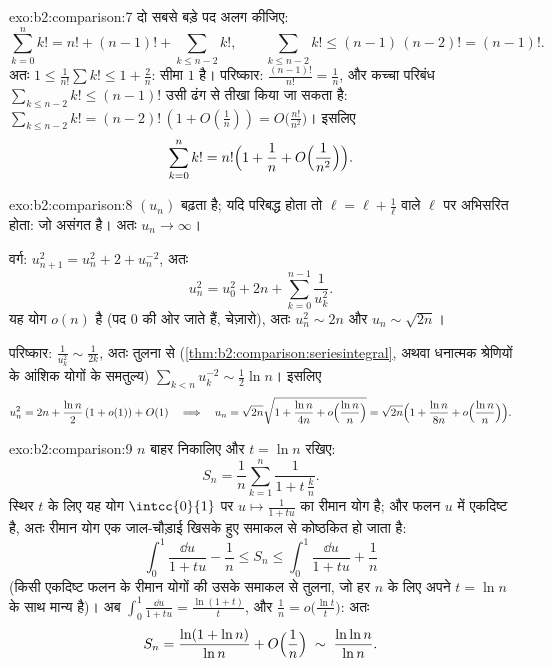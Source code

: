 \begin{solution}{exo:b2:comparison:7}
दो सबसे बड़े पद अलग कीजिए:
\[
\sum_{k=0}^{n} k! = n! + (n-1)! + \sum_{k \leq n-2} k! ,
\qquad
\sum_{k\leq n-2} k! \leq (n-1)\,(n-2)! = (n-1)! .
\]
अतः $1 \leq \frac{1}{n!}\sum k! \leq 1 + \frac{2}{n}$: सीमा $1$ है। परिष्कार: $\frac{(n-1)!}{n!} = \frac1n$, और कच्चा परिबंध $\sum_{k \leq n-2}k! \leq (n-1)!$ उसी ढंग से
तीखा किया जा सकता है: $\sum_{k\leq n-2} k! = (n-2)!\,(1 + O(\frac1n)) = O\bigl(\frac{n!}{n^2}\bigr)$। इसलिए
\[
\sum_{k=0}^{n} k! = n!\Bigl(1 + \frac1n + O\Bigl(\frac{1}{n^2}\Bigr)\Bigr).
\]
\end{solution}

\begin{solution}{exo:b2:comparison:8}
$(u_n)$ बढ़ता है; यदि परिबद्ध होता तो $\ell = \ell + \frac1\ell$ वाले $\ell$ पर अभिसरित होता: जो असंगत
है। अतः $u_n \to \infty$।

वर्ग: $u_{n+1}^2 = u_n^2 + 2 + u_n^{-2}$, अतः
\[
u_n^2 = u_0^2 + 2n + \sum_{k=0}^{n-1} \frac{1}{u_k^2} .
\]
यह योग $o(n)$ है (पद $0$ की ओर जाते हैं, चेज़ारो), अतः $u_n^2 \sim 2n$ और $u_n \sim \sqrt{2n}$।

परिष्कार: $\frac{1}{u_k^2} \sim \frac{1}{2k}$, अतः तुलना से (\cref{thm:b2:comparison:seriesintegral}, अथवा धनात्मक श्रेणियों के आंशिक योगों
के समतुल्य) $\sum_{k<n} u_k^{-2} \sim \frac12 \ln n$। इसलिए
\[
u_n^2 = 2n + \frac{\ln n}{2}\,(1 + o(1)) + O(1)
\quad\Longrightarrow\quad
u_n = \sqrt{2n}\sqrt{1 + \frac{\ln n}{4n} + o\Bigl(\frac{\ln
n}{n}\Bigr)}
= \sqrt{2n}\Bigl(1 + \frac{\ln n}{8n} + o\Bigl(\frac{\ln
n}{n}\Bigr)\Bigr).
\]
\end{solution}

\begin{solution}{exo:b2:comparison:9}
$n$ बाहर निकालिए और $t = \ln n$ रखिए:
\[
S_n = \frac1n \sum_{k=1}^{n} \frac{1}{1 + t\,\frac kn} .
\]
स्थिर $t$ के लिए यह योग $\intcc{0}{1}$ पर $u \mapsto \frac{1}{1 +
tu}$ का रीमान योग है; और फलन $u$ में
एकदिष्ट है, अतः रीमान योग एक जाल-चौड़ाई खिसके हुए समाकल से कोष्ठकित हो
जाता है:
\[
\int_0^1 \frac{\dd u}{1 + tu} - \frac1n
\leq S_n \leq \int_0^1 \frac{\dd u}{1 + tu} + \frac1n
\]
(किसी एकदिष्ट फलन के रीमान योगों की उसके समाकल से तुलना, जो हर $n$ के
लिए अपने $t = \ln n$ के साथ मान्य है)। अब $\int_0^1 \frac{\dd u}{1 + tu} = \frac{\ln(1 + t)}{t}$, और $\frac1n = o\bigl(\frac{\ln t}{t}\bigr)$: अतः
\[
S_n = \frac{\ln(1 + \ln n)}{\ln n} + O\Bigl(\frac 1n\Bigr)
\;\sim\; \frac{\ln\ln n}{\ln n} .
\]
\end{solution}

